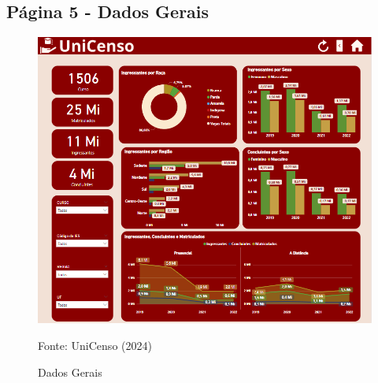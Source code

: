 \documentclass[a4paper,12pt]{article}
\begin{document}
\subsection{Página 5 - Dados Gerais}
\begin{figure}[H]
    \centering
    \includegraphics[width=\textwidth]{Imagem_5}
    \caption{Dados Gerais}
    \label{fig:ingressantes_regiao}
    \small Fonte: UniCenso (2024)
\end{figure}
\end{document}
